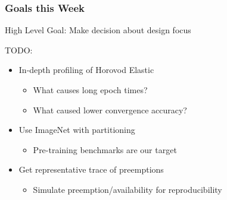   \begin{frame}
    \frametitle{Goals this Week}

    High Level Goal: Make decision about design focus

    \vspace{2em}
    TODO:
    \begin{itemize}
      \item In-depth profiling of Horovod Elastic
      \begin{itemize}
        \item What causes long epoch times?
        \item What caused lower convergence accuracy?
      \end{itemize}

      \item Use ImageNet with partitioning
      \begin{itemize}
        \item Pre-training benchmarks are our target
      \end{itemize}

      \item Get representative trace of preemptions
      \begin{itemize}
        \item Simulate preemption/availability for reproducibility
      \end{itemize}
    
    \end{itemize}
  \end{frame}


